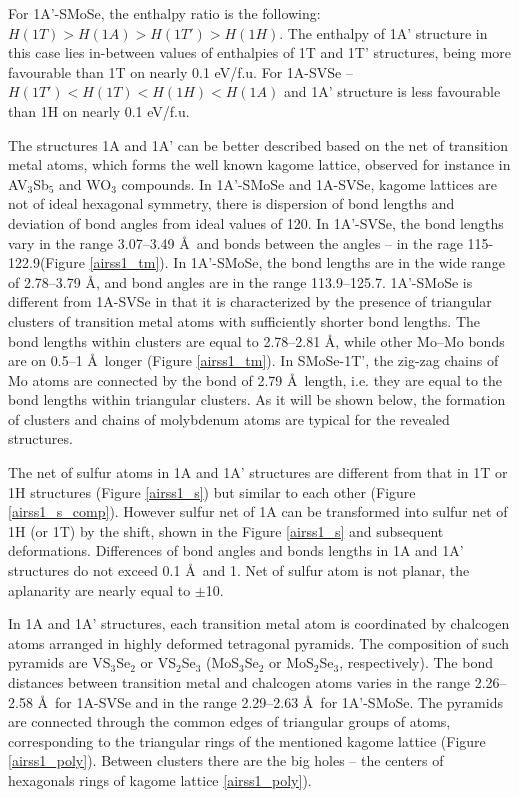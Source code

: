 \documentclass[a4paperm]{article}
\begin{document}
For 1A'-SMoSe, the enthalpy ratio is the following: $H(1T) > H(1A) > H(1T') > H(1H)$.
The enthalpy of 1A' structure in this case lies in-between values of enthalpies of 1T and 1T' structures, being more favourable than 1T on nearly 0.1 eV/f.u.
For 1A-SVSe -- $H(1T') < H(1T) < H(1H) < H(1A)$ and 1A' structure is less favourable than 1H on nearly 0.1 eV/f.u.


The structures 1A and 1A' can be better described based on the net of transition metal atoms, which forms the well known kagome lattice\cite{zhang2021_kagome}, observed for instance in AV$_3$Sb$_5$ \cite{ortiz2021} and WO$_3$ \cite{gerand1979} compounds.
In 1A'-SMoSe and 1A-SVSe, kagome lattices are not of ideal hexagonal symmetry, there is dispersion of bond lengths and deviation of bond angles from ideal values of 120\textdegree.
In 1A'-SVSe, the bond lengths vary in the range 3.07--3.49 \AA\ and bonds between the angles – in the rage 115-122.9\textdegree (Figure \ref{airss1_tm}).
In 1A'-SMoSe, the bond lengths are in the wide range of 2.78--3.79 \AA, and bond angles are in the range 113.9--125.7\textdegree.
1A'-SMoSe is different from 1A-SVSe in that it is characterized by the presence of triangular clusters of transition metal atoms with sufficiently shorter bond lengths.
The bond lengths within clusters are equal to 2.78--2.81 \AA, while other Mo--Mo bonds are on 0.5--1 \AA\ longer (Figure \ref{airss1_tm}).
In SMoSe-1T', the zig-zag chains of Mo atoms are connected by the bond of 2.79 \AA\ length, i.e. they are equal to the bond lengths within triangular clusters.
As it will be shown below, the formation of clusters and chains of molybdenum atoms are typical for the revealed structures.




The net of sulfur atoms in 1A and 1A' structures are different from that in 1T or 1H structures (Figure \ref{airss1_s}) but similar to each other (Figure \ref{airss1_s_comp}).
However sulfur net of 1A can be transformed into sulfur net of 1H (or 1T) by the shift, shown in the Figure \ref{airss1_s} and subsequent deformations.
Differences of bond angles and bonds lengths in 1A and 1A' structures do not exceed 0.1 \AA\ and 1\textdegree.
Net of sulfur atom is not planar, the aplanarity are nearly equal to $\pm$10\textdegree.

In 1A and 1A' structures, each transition metal atom is coordinated by  chalcogen atoms arranged in highly deformed tetragonal pyramids.
The composition of such pyramids are VS$_3$Se$_2$ or VS$_2$Se$_3$ (MoS$_3$Se$_2$ or MoS$_2$Se$_3$, respectively).
The bond distances between transition metal and chalcogen atoms varies in the range 2.26--2.58 \AA\ for 1A-SVSe and in the range 2.29--2.63 \AA\ for 1A'-SMoSe.
The pyramids are connected through the common edges of triangular groups of atoms, corresponding to the triangular rings of the mentioned kagome lattice (Figure \ref{airss1_poly}).
Between clusters there are the big holes -- the centers of hexagonals rings of kagome lattice \ref{airss1_poly}).
\end{document}

